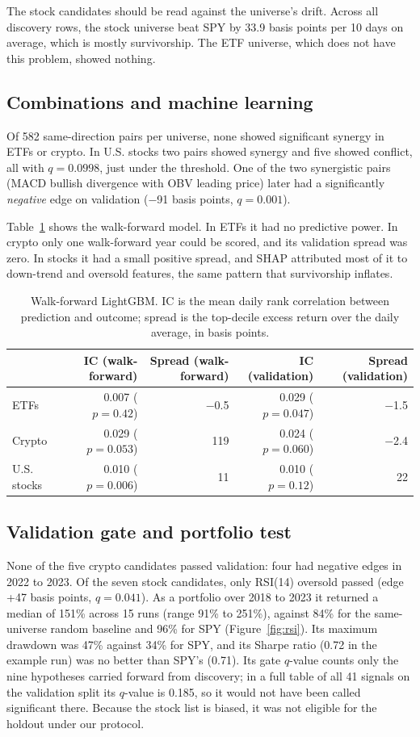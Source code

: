 \documentclass[11pt]{article}
\begin{document}
The stock candidates should be read against the universe's drift. Across all discovery rows, the
stock universe beat SPY by 33.9 basis points per 10 days on average, which is mostly survivorship.
The ETF universe, which does not have this problem, showed nothing.

\subsection{Combinations and machine learning}
Of 582 same-direction pairs per universe, none showed significant synergy in ETFs or crypto. In
U.S. stocks two pairs showed synergy and five showed conflict, all with $q=0.0998$, just under the
threshold. One of the two synergistic pairs (MACD bullish divergence with OBV leading price)
later had a significantly \emph{negative} edge on validation ($-$91 basis points, $q=0.001$).

Table~\ref{tab:ml} shows the walk-forward model. In ETFs it had no predictive power. In crypto only
one walk-forward year could be scored, and its validation spread was zero. In stocks it had a small
positive spread, and SHAP attributed most of it to down-trend and oversold features, the same
pattern that survivorship inflates.

\begin{table}[h]
\centering\small
\caption{Walk-forward LightGBM. IC is the mean daily rank correlation between prediction and
outcome; spread is the top-decile excess return over the daily average, in basis points.}\label{tab:ml}
\begin{tabular}{lrrrr}
\toprule
 & IC (walk-forward) & Spread (walk-forward) & IC (validation) & Spread (validation) \\
\midrule
ETFs & 0.007 ($p=0.42$) & $-$0.5 & 0.029 ($p=0.047$) & $-$1.5 \\
Crypto & 0.029 ($p=0.053$) & 119 & 0.024 ($p=0.060$) & $-$2.4 \\
U.S. stocks & 0.010 ($p=0.006$) & 11 & 0.010 ($p=0.12$) & 22 \\
\bottomrule
\end{tabular}
\end{table}

\subsection{Validation gate and portfolio test}
None of the five crypto candidates passed validation: four had negative edges in 2022 to 2023. Of
the seven stock candidates, only RSI(14) oversold passed (edge +47 basis points, $q=0.041$). As a
portfolio over 2018 to 2023 it returned a median of 151\% across 15 runs (range 91\% to 251\%),
against 84\% for the same-universe random baseline and 96\% for SPY (Figure~\ref{fig:rsi}). Its
maximum drawdown was 47\% against 34\% for SPY, and its Sharpe ratio (0.72 in the example run) was no
better than SPY's (0.71). Its gate $q$-value counts only the nine hypotheses carried forward from
discovery; in a full table of all 41 signals on the validation split its $q$-value is 0.185, so it
would not have been called significant there. Because the stock list is biased, it was not eligible
for the holdout under our protocol.
\end{document}
